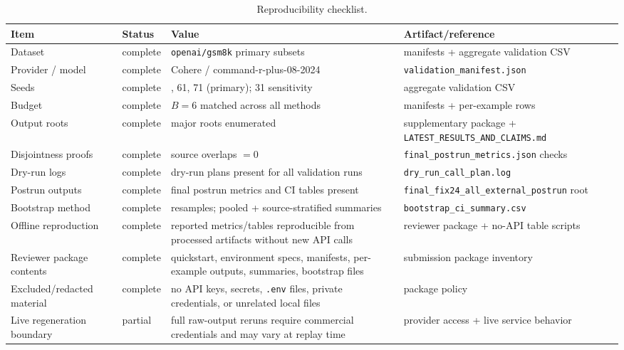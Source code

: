 \begin{table}[t]
\centering
\caption{Reproducibility checklist.}
\label{tab:repro_checklist}
\scriptsize
\setlength{\tabcolsep}{3pt}
\begin{tabularx}{\textwidth}{@{}>{\raggedright\arraybackslash}p{}>{\raggedright\arraybackslash}p{}>{\raggedright\arraybackslash}X>{\raggedright\arraybackslash}p{}@{}}
\toprule
Item & Status & Value & Artifact/reference \\
\midrule
Dataset & complete & \nolinkurl{openai/gsm8k} primary subsets & manifests + aggregate validation CSV \\
Provider / model & complete & Cohere / command-r-plus-08-2024 & \nolinkurl{validation_manifest.json} \\
Seeds & complete & 41, 61, 71 (primary); 31 sensitivity & aggregate validation CSV \\
Budget & complete & $B=6$ matched across all methods & manifests + per-example rows \\
Output roots & complete & major roots enumerated & supplementary package + \nolinkurl{LATEST_RESULTS_AND_CLAIMS.md} \\
Disjointness proofs & complete & source overlaps $= 0$ & \nolinkurl{final_postrun_metrics.json} checks \\
Dry-run logs & complete & dry-run plans present for all validation runs & \nolinkurl{dry_run_call_plan.log} \\
Postrun outputs & complete & final postrun metrics and CI tables present & \nolinkurl{final_fix24_all_external_postrun} root \\
Bootstrap method & complete & 5000 resamples; pooled + source-stratified summaries & \nolinkurl{bootstrap_ci_summary.csv} \\
Offline reproduction & complete & reported metrics/tables reproducible from processed artifacts without new API calls & reviewer package + no-API table scripts \\
Reviewer package contents & complete & quickstart, environment specs, manifests, per-example outputs, summaries, bootstrap files & submission package inventory \\
Excluded/redacted material & complete & no API keys, secrets, \texttt{.env} files, private credentials, or unrelated local files & package policy \\
Live regeneration boundary & partial & full raw-output reruns require commercial credentials and may vary at replay time & provider access + live service behavior \\

\end{tabularx}
\end{table}
